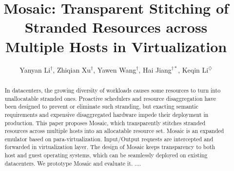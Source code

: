 \documentclass[sigplan,10pt]{acmart}
\begin{document}
\title{Mosaic: Transparent Stitching of Stranded Resources across Multiple Hosts in Virtualization}

\author{Yanyan Li$^\dagger$, Zhiqian Xu$^\dagger$, Yawen Wang$^\dagger$, Hai Jiang$^{\dagger*}$, Keqin Li$^\diamondsuit$}



\begin{abstract}
In datacenters, the growing diversity of workloads causes some resources to turn into unallocatable stranded ones. Proactive schedulers and resource disaggregation have been designed to prevent or eliminate such stranding, but exacting semantic requirements and expensive disaggregated hardware impede their deployment in production. This paper proposes Mosaic, which transparently stitches stranded resources across multiple hosts into an allocatable resource set. Mosaic is an expanded emulator based on para-virtualization. Input/Output requests are intercepted and forwarded in virtualization layer. The design of Mosaic keeps transparency to both host and guest operating systems, which can be seamlessly deployed on existing datacenters. We prototype Mosaic and evaluate it. ....
\end{abstract}
\maketitle
\end{document}
